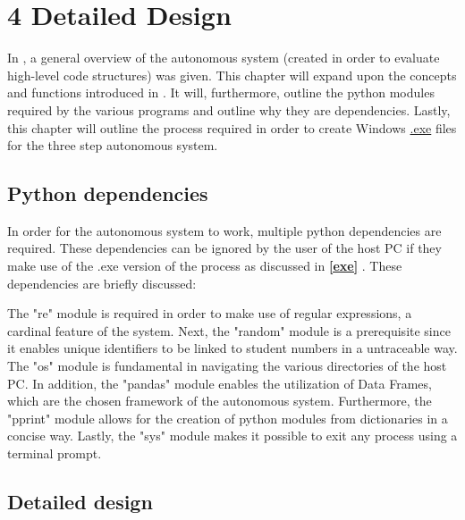 

\chapter*{4 Detailed Design}
\label{4detailedd}
\setcounter{chapter}{4}
\setcounter{section}{0}
\setcounter{figure}{0}
\setcounter{table}{0}

In \textbf{}, a general overview of the autonomous system (created in order to evaluate high-level code structures) was given. This chapter will expand upon the concepts and functions introduced in \textbf{}. It will, furthermore, outline the python modules required by the various programs and outline why they are dependencies. Lastly, this chapter will outline the process required in order to create Windows \hyperref[listExt]{.exe} files for the three step autonomous system. 

\section{Python dependencies}
\label{PyDep}
In order for the autonomous system to work, multiple python dependencies are required. These dependencies can be ignored by the user of the host PC if they make use of the .exe version of the process as discussed in \textbf{\ref{exe} }. These dependencies are briefly discussed:



The "re" module is required in order to make use of regular expressions, a cardinal feature of the system. Next, the "random" module is a prerequisite since it enables unique identifiers to be linked to student numbers in a untraceable way. The "os" module is fundamental in navigating the various directories of the host PC. In addition, the "pandas" module enables the utilization of Data Frames, which are the chosen framework of the autonomous system. Furthermore, the "pprint" module allows for the creation of python modules from dictionaries in a concise way. Lastly, the "sys" module makes it possible to exit any process using a terminal prompt.


\section{Detailed design}
\label{detDes}


